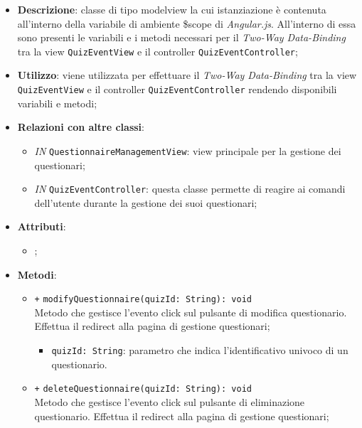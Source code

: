 							\begin{itemize}
								\item \textbf{Descrizione}: classe di tipo modelview la cui istanziazione è contenuta all'interno della variabile di ambiente \$scope di \textit{Angular.js}. All'interno di essa sono presenti le variabili e i metodi necessari per il \textit{Two-Way Data-Binding} tra la view \texttt{QuizEventView} e il controller \texttt{QuizEventController};
								\item \textbf{Utilizzo}: viene utilizzata per effettuare il \textit{Two-Way Data-Binding} tra la view \texttt{QuizEventView} e il controller \texttt{QuizEventController} rendendo disponibili variabili e metodi;
								\item \textbf{Relazioni con altre classi}: 
								\begin{itemize}
									\item \textit{IN} \texttt{QuestionnaireManagementView}: view principale per la gestione dei questionari; 
									\item \textit{IN} \texttt{QuizEventController}: questa classe permette di reagire ai comandi dell'utente durante la gestione dei suoi questionari;
								\end{itemize}
								\item \textbf{Attributi}: 
								\begin{itemize}
									\item ;
								\end{itemize}
								\item \textbf{Metodi}: 
								\begin{itemize}
									\item \texttt{+} \texttt{modifyQuestionnaire(quizId: String): void} \\
									Metodo che gestisce l’evento click sul pulsante di modifica questionario. Effettua il redirect alla pagina di gestione questionari;
									\begin{itemize}
										\item \texttt{quizId: String}: parametro che indica l'identificativo univoco di un questionario.
									\end{itemize}
									\item \texttt{+} \texttt{deleteQuestionnaire(quizId: String): void} \\
									Metodo che gestisce l’evento click sul pulsante di eliminazione questionario. Effettua il redirect alla pagina di gestione questionari;  
									\begin{itemize}

\end{itemize}
\end{itemize}
\end{itemize}
